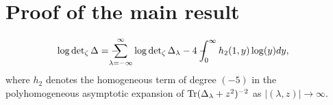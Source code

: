 \section{Proof of the main result}

\begin{theorem}
\begin{align}
\log \det\nolimits_{\zeta} \Delta &= \regsum_{\lambda=-\infty}^\infty \log \det\nolimits_{\zeta} \Delta_\lambda 
- 4 \regint_0^\infty h_{2}(1,y) \log (y) dy,
\end{align}
where $h_{2}$ denotes the homogeneous term of degree $(-5)$ in the 
polyhomogeneous asymptotic expansion of $\textup{Tr}(\Delta_\lambda + z^2)^{-2}$
as $|(\lambda, z)|\to \infty$.
\end{theorem}

